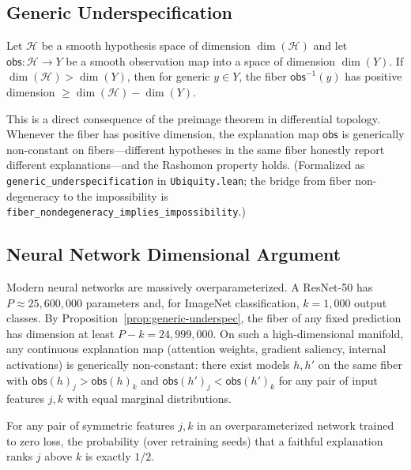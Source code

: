 \documentclass[twoside]{jmlr}
\newcommand{\sH}{\mathcal{H}}
\begin{document}
\subsection{Generic Underspecification}
\label{sec:generic-underspec}

\begin{proposition}
\label{prop:generic-underspec}
Let $\sH$ be a smooth hypothesis space of dimension $\dim(\sH)$ and let
$\mathsf{obs} : \sH \to Y$ be a smooth observation map into a space of
dimension $\dim(Y)$.  If $\dim(\sH) > \dim(Y)$, then for generic
$y \in Y$, the fiber $\mathsf{obs}^{-1}(y)$ has positive dimension
$\geq \dim(\sH) - \dim(Y)$.
\end{proposition}

\noindent
This is a direct consequence of the preimage theorem in differential
topology.  Whenever the fiber has positive dimension, the explanation map
$\mathsf{obs}$ is generically non-constant on fibers---different hypotheses
in the same fiber honestly report different explanations---and the Rashomon
property holds.  (Formalized as \texttt{generic\_underspecification} in
\texttt{Ubiquity.lean}; the bridge from fiber non-degeneracy to the
impossibility is \texttt{fiber\_nondegeneracy\_implies\_impossibility}.)

\subsection{Neural Network Dimensional Argument}
\label{sec:nn-dimensional}

Modern neural networks are massively overparameterized.  A ResNet-50 has
$P \approx 25{,}600{,}000$ parameters and, for ImageNet classification,
$k = 1{,}000$ output classes.  By Proposition~\ref{prop:generic-underspec},
the fiber of any fixed prediction has dimension at least
$P - k = 24{,}999{,}000$.  On such a high-dimensional manifold, any
continuous explanation map (attention weights, gradient saliency, internal
activations) is generically non-constant: there exist models $h, h'$ on the
same fiber with $\mathsf{obs}(h)_j > \mathsf{obs}(h)_k$ and
$\mathsf{obs}(h')_j < \mathsf{obs}(h')_k$ for any pair of input features
$j, k$ with equal marginal distributions.

\begin{corollary}
\label{cor:coin-flip}
For any pair of symmetric features $j, k$ in an overparameterized network
trained to zero loss, the probability (over retraining seeds) that a
faithful explanation ranks $j$ above $k$ is exactly $1/2$.
\end{corollary}
\end{document}

